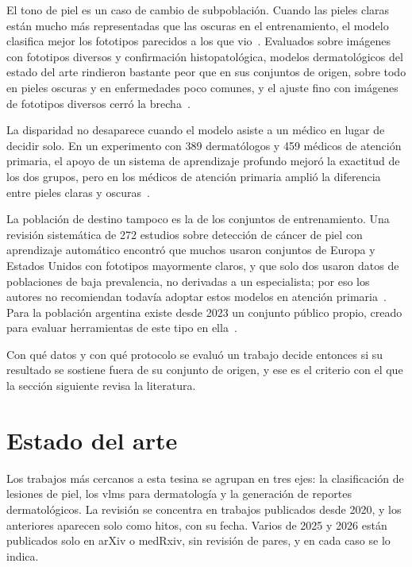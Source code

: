 El tono de piel es un caso de cambio de subpoblación. Cuando las pieles claras están mucho más representadas
que las oscuras en el entrenamiento, el modelo clasifica mejor los fototipos parecidos a los que
vio~\cite{groh2021neural}. Evaluados sobre imágenes con fototipos diversos y confirmación histopatológica,
modelos dermatológicos del estado del arte rindieron bastante peor que en sus conjuntos de origen, sobre todo
en pieles oscuras y en enfermedades poco comunes, y el ajuste fino con imágenes de fototipos diversos cerró la
brecha~\cite{daneshjou2022disparities}.

\begingroup La disparidad no desaparece cuando el modelo asiste a un médico en lugar de decidir solo. En un
experimento con 389 dermatólogos y 459 médicos de atención primaria, el apoyo de un sistema de aprendizaje
profundo mejoró la exactitud de los dos grupos, pero en los médicos de atención primaria amplió la diferencia
entre pieles claras y oscuras~\cite{groh2024learningaided}. \par\endgroup

La población de destino tampoco es la de los conjuntos de entrenamiento. Una revisión sistemática de 272
estudios sobre detección de cáncer de piel con aprendizaje automático encontró que muchos usaron conjuntos de
Europa y Estados Unidos con fototipos mayormente claros, y que solo dos usaron datos de poblaciones de baja
prevalencia, no derivadas a un especialista; por eso los autores no recomiendan todavía adoptar estos modelos en atención
primaria~\cite{jones2022intelligence}. Para la población argentina existe desde 2023 un conjunto público propio,
creado para evaluar herramientas de este tipo en ella~\cite{riccilara2023dataset}.

Con qué datos y con qué protocolo se evaluó un trabajo decide entonces si su resultado se sostiene fuera de su
conjunto de origen, y ese es el criterio con el que la sección siguiente revisa la literatura.

\section{Estado del arte}
\label{sec:estado_arte}

Los trabajos más cercanos a esta tesina se agrupan en tres ejes: la clasificación de lesiones de piel, los
\glspl{vlm} para dermatología y la generación de reportes dermatológicos. La revisión se concentra en trabajos
publicados desde 2020, y los anteriores aparecen solo como hitos, con su fecha. Varios de 2025 y 2026 están
publicados solo en arXiv o medRxiv, sin revisión de pares, y en cada caso se lo indica.

